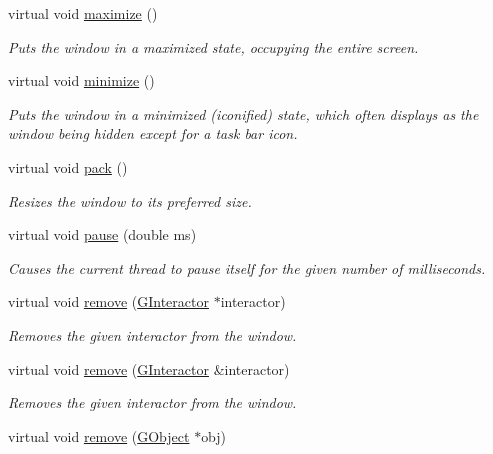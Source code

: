 \begin{DoxyCompactItemize}
virtual void \mbox{\hyperlink{classsgl_1_1GWindow_a1aa481996525792213f28d91fbb4894b}{maximize}} ()
\begin{DoxyCompactList}\small\item\em Puts the window in a maximized state, occupying the entire screen. \end{DoxyCompactList}\item 
virtual void \mbox{\hyperlink{classsgl_1_1GWindow_a85ffaebe489c0ecf8051715ecf59babb}{minimize}} ()
\begin{DoxyCompactList}\small\item\em Puts the window in a minimized (iconified) state, which often displays as the window being hidden except for a task bar icon. \end{DoxyCompactList}\item 
virtual void \mbox{\hyperlink{classsgl_1_1GWindow_a915ffc82b17862ab1d2a466a79d23a3f}{pack}} ()
\begin{DoxyCompactList}\small\item\em Resizes the window to its preferred size. \end{DoxyCompactList}\item 
virtual void \mbox{\hyperlink{classsgl_1_1GWindow_adc7d99bb2dc43b8337e89b7d54cab9d3}{pause}} (double ms)
\begin{DoxyCompactList}\small\item\em Causes the current thread to pause itself for the given number of milliseconds. \end{DoxyCompactList}\item 
virtual void \mbox{\hyperlink{classsgl_1_1GWindow_a1c12b1fde5c2ef10d79d4ee51e670efa}{remove}} (\mbox{\hyperlink{classsgl_1_1GInteractor}{G\+Interactor}} $\ast$interactor)
\begin{DoxyCompactList}\small\item\em Removes the given interactor from the window. \end{DoxyCompactList}\item 
virtual void \mbox{\hyperlink{classsgl_1_1GWindow_ade2376c458ac401a0bd2dbe44271509e}{remove}} (\mbox{\hyperlink{classsgl_1_1GInteractor}{G\+Interactor}} \&interactor)
\begin{DoxyCompactList}\small\item\em Removes the given interactor from the window. \end{DoxyCompactList}\item 
virtual void \mbox{\hyperlink{classsgl_1_1GWindow_afc8bff4a24e05c696cbe4cba7403e558}{remove}} (\mbox{\hyperlink{classsgl_1_1GObject}{G\+Object}} $\ast$obj)

\end{DoxyCompactItemize}

